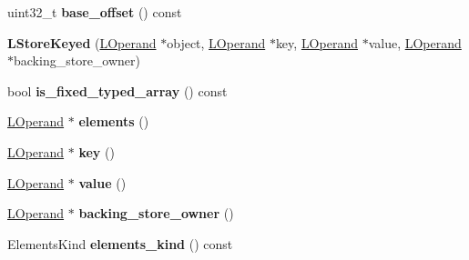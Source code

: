 \begin{DoxyCompactItemize}
\item 
uint32\+\_\+t {\bfseries base\+\_\+offset} () const \hypertarget{classv8_1_1internal_1_1_l_store_keyed_aa88021608606f53948b262edeccda1e6}{}\label{classv8_1_1internal_1_1_l_store_keyed_aa88021608606f53948b262edeccda1e6}

\item 
{\bfseries L\+Store\+Keyed} (\hyperlink{classv8_1_1internal_1_1_l_operand}{L\+Operand} $\ast$object, \hyperlink{classv8_1_1internal_1_1_l_operand}{L\+Operand} $\ast$key, \hyperlink{classv8_1_1internal_1_1_l_operand}{L\+Operand} $\ast$value, \hyperlink{classv8_1_1internal_1_1_l_operand}{L\+Operand} $\ast$backing\+\_\+store\+\_\+owner)\hypertarget{classv8_1_1internal_1_1_l_store_keyed_a40acd77f50898d8601b8587509f6443f}{}\label{classv8_1_1internal_1_1_l_store_keyed_a40acd77f50898d8601b8587509f6443f}

\item 
bool {\bfseries is\+\_\+fixed\+\_\+typed\+\_\+array} () const \hypertarget{classv8_1_1internal_1_1_l_store_keyed_a9e741b26eae820e0effc84187cef9fd1}{}\label{classv8_1_1internal_1_1_l_store_keyed_a9e741b26eae820e0effc84187cef9fd1}

\item 
\hyperlink{classv8_1_1internal_1_1_l_operand}{L\+Operand} $\ast$ {\bfseries elements} ()\hypertarget{classv8_1_1internal_1_1_l_store_keyed_a65b49dc68849be2f341b9f6db3399248}{}\label{classv8_1_1internal_1_1_l_store_keyed_a65b49dc68849be2f341b9f6db3399248}

\item 
\hyperlink{classv8_1_1internal_1_1_l_operand}{L\+Operand} $\ast$ {\bfseries key} ()\hypertarget{classv8_1_1internal_1_1_l_store_keyed_a768f44140c1abab8ec345ef73cb417ea}{}\label{classv8_1_1internal_1_1_l_store_keyed_a768f44140c1abab8ec345ef73cb417ea}

\item 
\hyperlink{classv8_1_1internal_1_1_l_operand}{L\+Operand} $\ast$ {\bfseries value} ()\hypertarget{classv8_1_1internal_1_1_l_store_keyed_a6a97e536a0eed02971eb915a57b6e898}{}\label{classv8_1_1internal_1_1_l_store_keyed_a6a97e536a0eed02971eb915a57b6e898}

\item 
\hyperlink{classv8_1_1internal_1_1_l_operand}{L\+Operand} $\ast$ {\bfseries backing\+\_\+store\+\_\+owner} ()\hypertarget{classv8_1_1internal_1_1_l_store_keyed_a21d192f5ddd6bbb5198880a6e2d03db3}{}\label{classv8_1_1internal_1_1_l_store_keyed_a21d192f5ddd6bbb5198880a6e2d03db3}

\item 
Elements\+Kind {\bfseries elements\+\_\+kind} () const \hypertarget{classv8_1_1internal_1_1_l_store_keyed_a09fd8ff5055daa16ec86a8f9bf4a1388}{}\label{classv8_1_1internal_1_1_l_store_keyed_a09fd8ff5055daa16ec86a8f9bf4a1388}


\end{DoxyCompactItemize}
